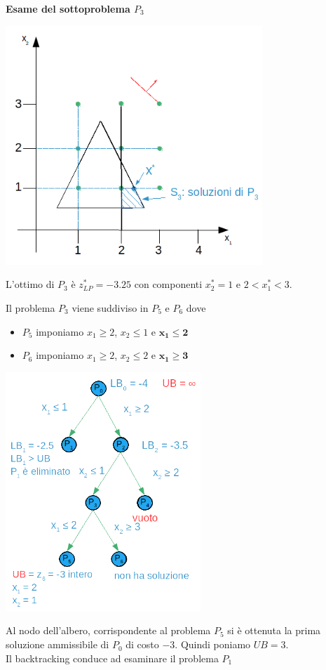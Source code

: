 \textbf{Esame del sottoproblema $P_{3}$}

\centerline{\includegraphics[height=9cm]{images/graph23.png}}

L'ottimo di $P_{3}$ è $z_{LP}^{*}=-3.25$ con componenti $x_{2}^{*}=1$ e $2 < x_{1}^{*} < 3$.

Il problema $P_{3}$ viene suddiviso in $P_{5}$ e $P_{6}$ dove
\begin{itemize}
	\item $P_{5}$ imponiamo $x_{1}\ge 2$, $x_{2}\le 1$ e \underline{$\boldsymbol{x_{1}\le 2}$}
	\item $P_{6}$ imponiamo $x_{1}\ge 2$, $x_{2}\le 2$ e \underline{$\boldsymbol{x_{1}\ge 3}$}
\end{itemize}

\centerline{\includegraphics[height=9cm]{images/graph24.png}}

Al nodo dell'albero, corrispondente al problema $P_{5}$ si è ottenuta la prima soluzione ammissibile di $P_{0}$ di costo $-3$. Quindi poniamo \textbf{$UB = 3$}.\\
Il backtracking conduce ad esaminare il problema $P_{1}$

